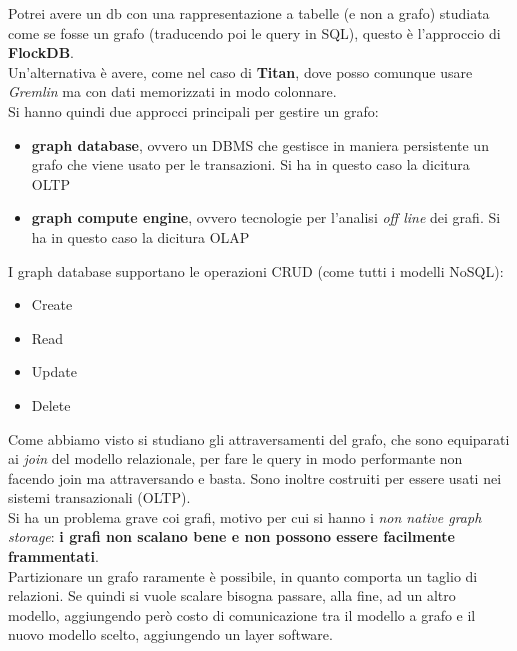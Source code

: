 \documentclass[a4paper,12pt, oneside]{book}
\begin{document}
Potrei avere un db con una rappresentazione a tabelle (e non a grafo) studiata
come se fosse un grafo (traducendo poi le query in SQL), questo è l'approccio di
\textbf{FlockDB}.\\
Un'alternativa è avere, come nel caso di \textbf{Titan}, dove posso comunque
usare \textit{Gremlin} ma con dati memorizzati in modo colonnare.\\
Si hanno quindi due approcci principali per gestire un grafo:
\begin{itemize}
  \item \textbf{graph database}, ovvero un DBMS che gestisce in maniera
  persistente un grafo che viene usato per le transazioni. Si ha in questo caso
  la dicitura OLTP
  \item \textbf{graph compute engine}, ovvero tecnologie per l'analisi
  \textit{off line} dei grafi. Si ha in questo caso la dicitura OLAP
\end{itemize}
I graph database supportano le operazioni CRUD (come tutti i modelli NoSQL):
\begin{itemize}
  \item Create
  \item Read
  \item Update
  \item Delete
\end{itemize}
Come abbiamo visto si studiano gli attraversamenti del grafo, che sono
equiparati ai \textit{join} del modello relazionale, per fare le query in modo
performante non facendo join ma attraversando e basta. Sono inoltre costruiti
per essere usati nei sistemi transazionali (OLTP). \\
Si ha un problema grave coi grafi, motivo per cui si hanno i \textit{non native
  graph storage}: \textbf{i grafi non scalano bene e non possono essere
  facilmente frammentati}.\\
Partizionare un grafo raramente è possibile, in quanto comporta un taglio di
relazioni. Se quindi si vuole scalare bisogna passare, alla fine, ad un altro
modello, aggiungendo però costo di comunicazione tra il modello a grafo e il
nuovo modello scelto, aggiungendo un layer software.\\
\end{document}
